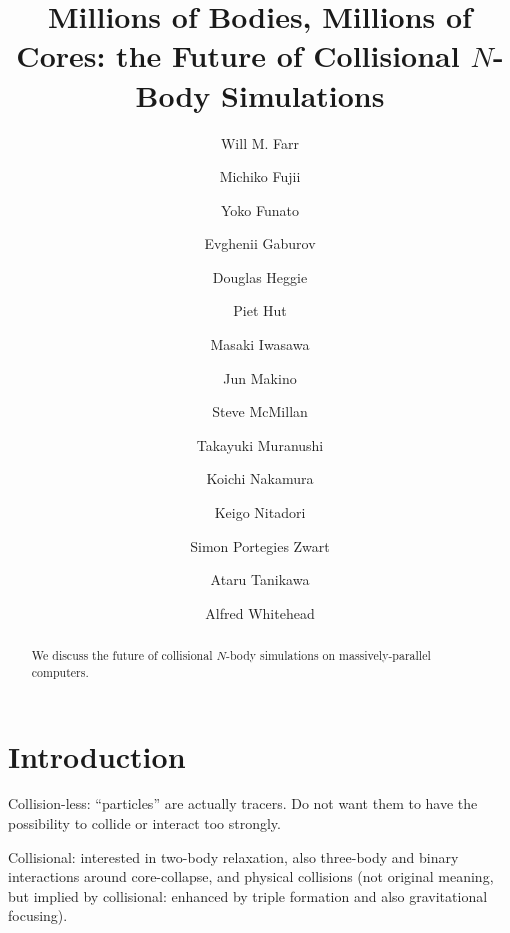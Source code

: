 \documentclass[5p,authoryear]{elsarticle}
\begin{document}
\title{Millions of Bodies, Millions of Cores: the Future of
  Collisional $N$-Body Simulations}

\author[WMF]{Will M. Farr}
\author[MF]{Michiko Fujii}
\author[YF]{Yoko Funato}
\author[EG]{Evghenii Gaburov}
\author[DH]{Douglas Heggie}
\author[PH]{Piet Hut}
\author[MI]{Masaki Iwasawa}
\author[JM]{Jun Makino}
\author[SM]{Steve McMillan}
\author[TM]{Takayuki Muranushi}
\author[KN]{Koichi Nakamura}
\author[KN]{Keigo Nitadori}
\author[SZ]{Simon Portegies Zwart}
\author[AT]{Ataru Tanikawa}
\author[AW]{Alfred Whitehead}


\address[WMF]{Northwestern Center for Interdisciplinary Exploration
  and Research in Astrophysics, 2145 Sheridan Rd., Evanston IL 60208
  USA}

\address[PH]{Institute
  for Advanced Study, Princeton, NJ 08540, USA}

\address[JM]{Interactive Research Center of Science, Graduate
  School of Science and Engineering Tokyo Institute of Technology,
  2--12--1 Ookayama, Meguro, Tokyo 152-8551, Japan}

\begin{abstract}
  We discuss the future of collisional $N$-body simulations on
  massively-parallel computers.
\end{abstract}

\maketitle

\section{Introduction}

Collision-less: ``particles'' are actually tracers.  Do not want them
to have the possibility to collide or interact too strongly.

Collisional: interested in two-body relaxation, also three-body and
binary interactions around core-collapse, and physical collisions (not
original meaning, but implied by collisional: enhanced by triple
formation and also gravitational focusing).
\end{document}

